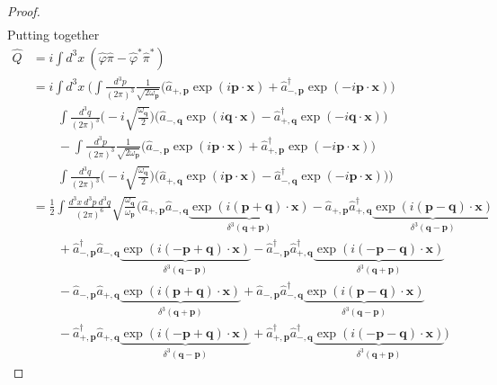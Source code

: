 \begin{proof}
\begin{equation*}
\begin{aligned}
        \end{aligned}
        \end{equation*}
        Putting together
        \begin{equation*}
        \begin{aligned}
            \hat Q & = i \int d^3 x ~ (\hat \varphi \hat \pi - \hat \varphi^* \hat \pi^*) \\ & = i \int d^3 x ~ \Big ( \int \frac{d^3 p}{{(2\pi)}^3} \frac{1}{\sqrt{2 \omega_{\mathbf p}}} \Big ( \hat a_{+, \mathbf p} \exp(i \mathbf p \cdot \mathbf x) + \hat a_{-, \mathbf p}^\dagger \exp(- i \mathbf p \cdot \mathbf x) \Big) \\ & \qquad \int \frac{d^3 q}{{(2\pi)}^3} \Big ( - i \sqrt{\frac{\omega_{\mathbf q}}{2}} \Big ) \Big ( \hat a_{-, \mathbf q} \exp(i \mathbf q \cdot \mathbf x) - \hat a_{+, \mathbf q}^\dagger \exp(- i \mathbf q \cdot \mathbf x) \Big) \\ & \qquad - \int \frac{d^3 p}{{(2\pi)}^3} \frac{1}{\sqrt{2 \omega_{\mathbf p}}} \Big ( \hat a_{-, \mathbf p} \exp(i \mathbf p \cdot \mathbf x) + \hat a_{+, \mathbf p}^\dagger \exp(- i \mathbf p \cdot \mathbf x) \Big) \\ & \qquad \int \frac{d^3 q}{{(2\pi)}^3} \Big ( - i \sqrt{\frac{\omega_{\mathbf q}}{2}} \Big ) \Big ( \hat a_{+, \mathbf q} \exp(i \mathbf p \cdot \mathbf x) - \hat a_{-, \mathbf q}^\dagger \exp(- i \mathbf p \cdot \mathbf x) \Big) \Big) \\ & = \frac{1}{2} \int \frac{d^3 x ~ d^3 p ~ d^3 q}{(2\pi)^6} \sqrt{\frac{\omega_{\mathbf q}}{\omega_{\mathbf p}}} \Big ( \hat a_{+, \mathbf p} \hat a_{-, \mathbf q} \underbrace{\exp(i (\mathbf p + \mathbf q) \cdot \mathbf x)}_{\delta^3 (\mathbf q + \mathbf p)} - \hat a_{+, \mathbf p} \hat a_{+, \mathbf q}^\dagger \underbrace{\exp(i (\mathbf p - \mathbf q) \cdot \mathbf x)}_{\delta^3 (\mathbf q - \mathbf p)} \\ & \qquad + \hat a_{-, \mathbf p}^\dagger \hat a_{-, \mathbf q} \underbrace{\exp(i (- \mathbf p + \mathbf q) \cdot \mathbf x)}_{\delta^3 (\mathbf q - \mathbf p)} - \hat a_{-, \mathbf p}^\dagger \hat a_{+, \mathbf q}^\dagger \underbrace{\exp(i (- \mathbf p - \mathbf q) \cdot \mathbf x)}_{\delta^3 (\mathbf q + \mathbf p)} \\ & \qquad - \hat a_{-, \mathbf p} \hat a_{+, \mathbf q} \underbrace{\exp(i (\mathbf p + \mathbf q) \cdot \mathbf x)}_{\delta^3 (\mathbf q + \mathbf p)} + \hat a_{-, \mathbf p} \hat a_{-, \mathbf q}^\dagger \underbrace{\exp(i (\mathbf p - \mathbf q) \cdot \mathbf x)}_{\delta^3 (\mathbf q - \mathbf p)} \\ & \qquad - \hat a_{+, \mathbf p}^\dagger \hat a_{+, \mathbf q} \underbrace{\exp(i (- \mathbf p + \mathbf q) \cdot \mathbf x)}_{\delta^3 (\mathbf q - \mathbf p)} + \hat a_{+, \mathbf p}^\dagger \hat a_{-, \mathbf q}^\dagger \underbrace{\exp(i (- \mathbf p - \mathbf q) \cdot \mathbf x)}_{\delta^3 (\mathbf q + \mathbf p)} \Big) 

\end{aligned}
\end{equation*}
\end{proof}
